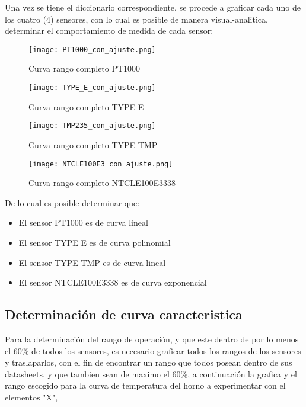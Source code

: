\documentclass[conference]{IEEEtran}
\begin{document}
Una vez se tiene el diccionario correspondiente, se procede a graficar cada uno de los cuatro (4) sensores, con lo cual es posible de manera visual-analitica, determinar el comportamiento de medida de cada sensor:


\begin{figure}[h!]
	\centering
	\texttt{[image: PT1000\_con\_ajuste.png]}
	\caption{Curva rango completo PT1000}
	\label{fig:1}
\end{figure}

\begin{figure}[h!]
	\centering
	\texttt{[image: TYPE\_E\_con\_ajuste.png]}
	\caption{Curva rango completo TYPE E}
	\label{fig:2}
\end{figure}

\begin{figure}[h!]
	\centering
	\texttt{[image: TMP235\_con\_ajuste.png]}
	\caption{Curva rango completo TYPE TMP}
	\label{fig:3}
\end{figure}

\begin{figure}[h!]
	\centering
	\texttt{[image: NTCLE100E3\_con\_ajuste.png]}
	\caption{Curva rango completo NTCLE100E3338}
	\label{fig:4}
\end{figure}

De lo cual es posible determinar que:\\

\begin{itemize}
	\item El sensor PT1000 es de curva lineal
	\item El sensor TYPE E es de curva polinomial
	\item El sensor TYPE TMP es de curva lineal
	\item El sensor NTCLE100E3338 es de curva exponencial
\end{itemize}



\subsection{Determinación de curva caracteristica}

Para la determinación del rango de operación, y que este dentro de por lo menos el 60\% de todos los sensores, es necesario graficar todos los rangos de los sensores y traslaparlos, con el fin de encontrar un rango que todos posean dentro de sus datasheets, y que tambien sean de maximo el 60\%, a continuación la grafica y el rango escogido para la curva de temperatura del horno a experimentar con el elementos "X",
\end{document}
